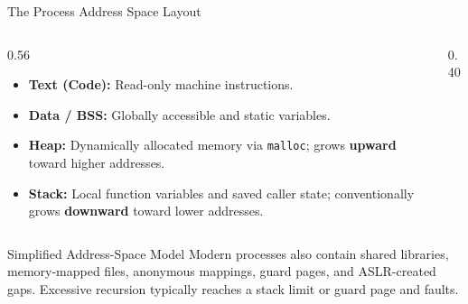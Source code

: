 \documentclass[aspectratio=169,11pt,t,xcolor=table]{beamer}
\newcommand{\key}[1]{\textbf{#1}}
\newcommand{\hex}[1]{\texttt{0x#1}}
\newcommand{\code}[1]{\texttt{#1}}
\begin{document}

\begin{frame}{The Process Address Space Layout}
\vspace{0.05cm}
\begin{columns}[T]
\begin{column}{0.56\textwidth}
\small
\begin{itemize}\setlength{\itemsep}{3pt}
  \item \key{Text (Code):} Read-only machine instructions.
  \item \key{Data / BSS:} Globally accessible and static variables.
  \item \key{Heap:} Dynamically allocated memory via \code{malloc}; grows \textbf{upward} toward higher addresses.
  \item \key{Stack:} Local function variables and saved caller state; conventionally grows \textbf{downward} toward lower addresses.
\end{itemize}
\end{column}

\begin{column}{0.40\textwidth}
\centering
{}
\end{column}
\end{columns}

\vfill
\begin{block}{Simplified Address-Space Model}
\footnotesize Modern processes also contain shared libraries, memory-mapped files, anonymous mappings, guard pages, and ASLR-created gaps. Excessive recursion typically reaches a stack limit or guard page and faults.
\end{block}
\vfill
\end{frame}
\end{document}
